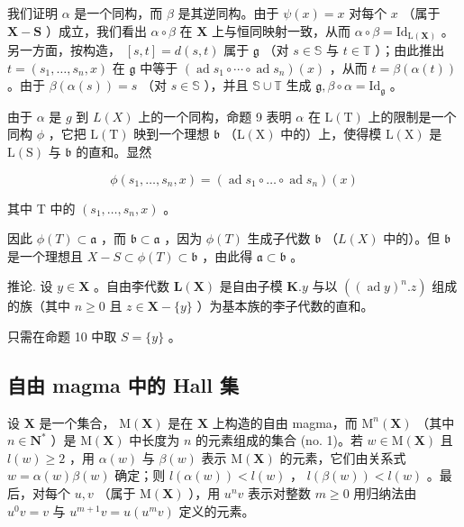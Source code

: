 我们证明 \(\alpha\) 是一个同构，而 \(\beta\) 是其逆同构。由于 \(\psi(x) = x\) 对每个 \(x\) （属于 \(\mathbf{X} - \mathbf{S}\) ）成立，我们看出 \(\alpha \circ \beta\) 在 \(\mathbf{X}\) 上与恒同映射一致，从而 \(\alpha \circ \beta = \mathrm{Id}_{\mathrm{L}(\mathbf{X})}\) 。另一方面，按构造， \([s, t] = d(s, t)\) 属于 \(\mathfrak{g}\) （对 \(s \in \mathbb{S}\) 与 \(t \in \mathbb{T}\) ）；由此推出 \(t = (s_1, \ldots, s_n, x)\) 在 \(\mathfrak{g}\) 中等于 \((\operatorname{ad} s_1 \circ \cdots \circ \operatorname{ad} s_n)(x)\) ，从而 \(t = \beta(\alpha(t))\) 。由于 \(\beta(\alpha(s)) = s\) （对 \(s \in \mathbb{S}\) ），并且 \(\mathbb{S} \cup \mathbb{T}\) 生成 \(\mathfrak{g}, \beta \circ \alpha = \mathrm{Id}_{\mathfrak{g}}\) 。

由于 \(\alpha\) 是 \(g\) 到 \(L(X)\) 上的一个同构，命题 9 表明 \(\alpha\) 在 \(\mathrm{L(T)}\) 上的限制是一个同构 \(\phi\) ，它把 \(\mathrm{L(T)}\) 映到一个理想 \(\mathfrak{b}\) （\(\mathrm{L(X)}\) 中的）上，使得模 \(\mathrm{L(X)}\) 是 \(\mathrm{L(S)}\) 与 \(\mathfrak{b}\) 的直和。显然

\[
\phi (s _ {1}, \dots , s _ {n}, x) = (\operatorname{ad} s _ {1} \circ \dots \circ \operatorname{ad} s _ {n}) (x)
\]

其中 T 中的 \((s_1, \ldots, s_n, x)\) 。

因此 \(\phi(T) \subset \mathfrak{a}\) ，而 \(\mathfrak{b} \subset \mathfrak{a}\) ，因为 \(\phi(T)\) 生成子代数 \(\mathfrak{b}\) （\(L(X)\) 中的）。但 \(\mathfrak{b}\) 是一个理想且 \(X - S \subset \phi(T) \subset \mathfrak{b}\) ，由此得 \(\mathfrak{a} \subset \mathfrak{b}\) 。

推论. 设 \(y \in \mathbf{X}\) 。自由李代数 \(\mathbf{L}(\mathbf{X})\) 是自由子模 \(\mathbf{K}.y\) 与以 \(((\operatorname{ad}y)^n.z)\) 组成的族（其中 \(n \geqslant 0\) 且 \(z \in \mathbf{X} - \{y\}\) ）为基本族的李子代数的直和。

只需在命题 10 中取 \(S = \{y\}\) 。

\subsection{自由 magma 中的 Hall 集}

设 \(\mathbf{X}\) 是一个集合， \(\mathrm{M}(\mathbf{X})\) 是在 \(\mathbf{X}\) 上构造的自由 magma，而 \(\mathrm{M}^n (\mathbf{X})\) （其中 \(n\in \mathbf{N}^*\) ）是 \(\mathrm{M}(\mathbf{X})\) 中长度为 \(n\) 的元素组成的集合 (no. 1)。若 \(w\in \mathrm{M}(\mathbf{X})\) 且 \(l(w)\geqslant 2\) ，用 \(\alpha (w)\) 与 \(\beta (w)\) 表示 \(\mathrm{M}(\mathbf{X})\) 的元素，它们由关系式 \(w = \alpha (w)\beta (w)\) 确定；则 \(l(\alpha (w)) < l(w)\) ， \(l(\beta (w)) < l(w)\) 。最后，对每个 \(u,v\) （属于 \(\mathrm{M}(\mathbf{X})\) ），用 \(u^n v\) 表示对整数 \(m\geqslant 0\) 用归纳法由 \(u^{0}v = v\) 与 \(u^{m + 1}v = u(u^{m}v)\) 定义的元素。


